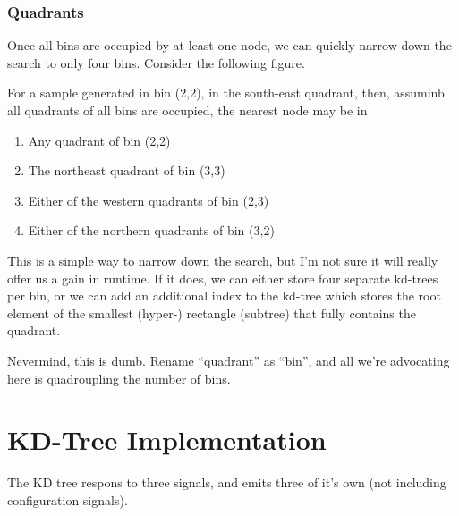 \subsubsection{Quadrants}

Once all bins are occupied by at least one node, we can quickly narrow down the search to only four bins. Consider the following figure.

\begin{figure}[H]
\begin{centering}
    \texttt{[image: \\figfile\{fig/nonempty\_full\_quad]}}
    \caption{Quandrants}
\end{centering} 
\end{figure}

For a sample generated in bin (2,2), in the south-east quadrant, then, assuminb all quadrants of all bins are occupied, the nearest node may be in 

\begin{enumerate}
    \item Any quadrant of bin (2,2)
    \item The northeast quadrant of bin (3,3)
    \item Either of the western quadrants of bin (2,3)
    \item Either of the northern quadrants of bin (3,2)
\end{enumerate}

This is a simple way to narrow down the search, but I'm not sure it will really offer us a gain in runtime. If it does, we can either store four separate kd-trees per bin, or we can add an additional index to the kd-tree which stores the root element of the smallest (hyper-) rectangle (subtree) that fully contains the quadrant.

Nevermind, this is dumb. Rename ``quadrant'' as ``bin'', and all we're advocating here is quadroupling the number of bins.

\section{KD-Tree Implementation}

\begin{figure}[H]
\begin{centering}
    \texttt{[image: \\figfile\{fig/blocks/kdtree]}}
    \caption{Sampler Block}
\end{centering}
\end{figure}

The KD tree respons to three signals, and emits three of it's own (not including configuration signals).

